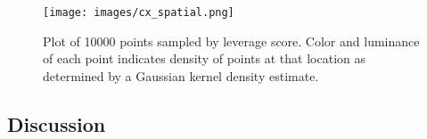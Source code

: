     \begin{figure} [h!btp]
    \begin{centering}
    \texttt{[image: images/cx\_spatial.png]}
    \end{centering}
    \caption{Plot of 10000 points sampled by leverage score. Color and
      luminance of each point indicates density of points at that location as
      determined by a Gaussian kernel density estimate.}
    \label{fig:cx_spatial}
    \end{figure} 


  \subsection{Discussion}
  \label{sect:lessons}
  
  

